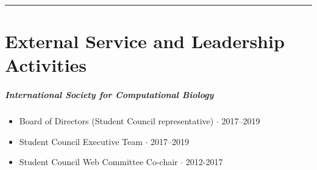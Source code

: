 \documentclass[10pt,letterpaper]{article}
\newcommand{\bigdot}{$\cdot$\xspace}
\newcommand{\cvsection}[1]{%
    \par\vspace{10pt}%
  \noindent\rule{\linewidth}{0.4pt}\par
  \vspace{-5.5ex}%
  \section*{#1}%
}
\begin{document}
\cvsection{External Service and Leadership Activities}

\subparagraph{International Society for Computational Biology}
\begin{itemize}
	\item Board of Directors (Student Council representative)  \bigdot 2017--2019
	\item Student Council Executive Team \bigdot 2017--2019
	\item Student Council Web Committee Co-chair \bigdot 2012-2017
\end{itemize}

%
%
\end{document}
